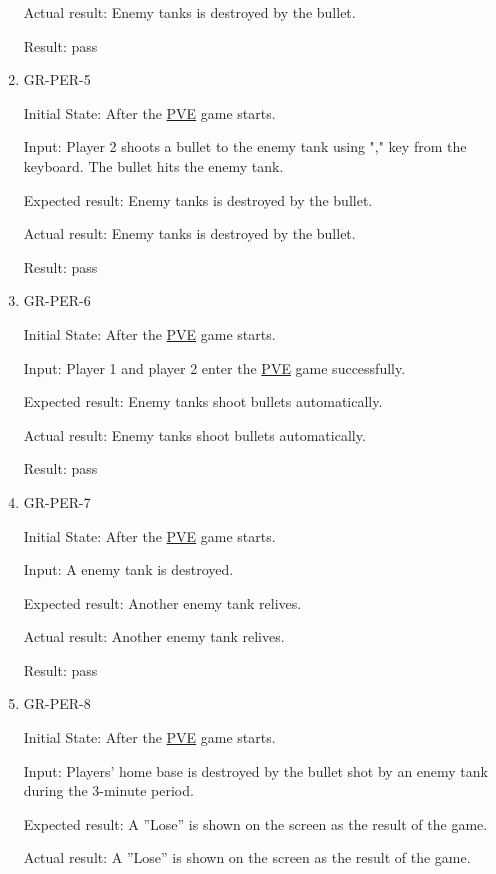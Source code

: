 \documentclass[12pt, titlepage]{article}
\begin{document}
\begin{enumerate}
Actual result: Enemy tanks is destroyed by the bullet.

Result: pass

\item{GR-PER-5\\}
					
Initial State: After the \underline{PVE} game starts.
					
Input: Player 2 shoots a bullet to the enemy tank using "," key from the keyboard. The bullet hits the enemy tank.
					
Expected result: Enemy tanks is destroyed by the bullet.
					
Actual result: Enemy tanks is destroyed by the bullet.

Result: pass

\item{GR-PER-6\\}
					
Initial State: After the \underline{PVE} game starts.
					
Input: Player 1 and player 2 enter the \underline{PVE} game successfully.
					
Expected result: Enemy tanks shoot bullets automatically. 
					
Actual result: Enemy tanks shoot bullets automatically. 

Result: pass

\item{GR-PER-7\\}
					
Initial State: After the \underline{PVE} game starts.
					
Input: A enemy tank is destroyed.
					
Expected result: Another enemy tank relives.
					
Actual result: Another enemy tank relives.

Result: pass

\item{GR-PER-8\\}
					
Initial State: After the \underline{PVE} game starts.
					
Input: Players' home base is destroyed by the bullet shot by an enemy tank during the 3-minute period.
					
Expected result: A ”Lose” is shown on the screen as the result of the game.
					
Actual result: A ”Lose” is shown on the screen as the result of the game.


\end{enumerate}
\end{document}
